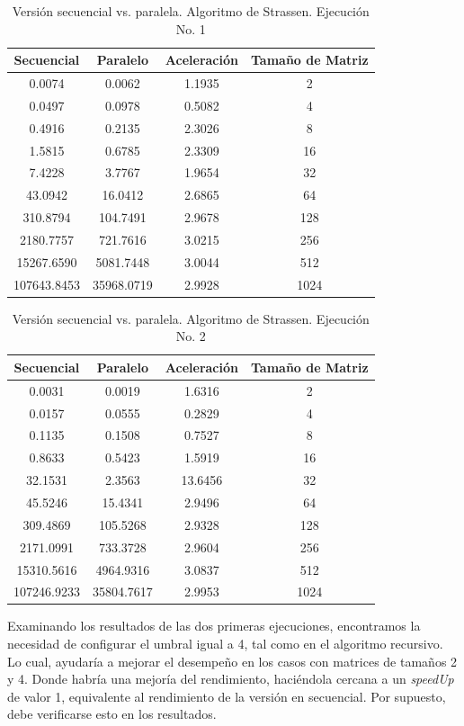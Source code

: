 \documentclass{article}
\begin{document}
\begin{table}[ht]
\centering
\begin{tabular}{|c|c|c|c|}
\hline
\textbf{Secuencial} & \textbf{Paralelo} & \textbf{Aceleración} & \textbf{Tamaño de Matriz} \\
\hline
0.0074 & 0.0062 & 1.1935 & 2 \\
0.0497 & 0.0978 & 0.5082 & 4 \\
0.4916 & 0.2135 & 2.3026 & 8 \\
1.5815 & 0.6785 & 2.3309 & 16 \\
7.4228 & 3.7767 & 1.9654 & 32 \\
43.0942 & 16.0412 & 2.6865 & 64 \\
310.8794 & 104.7491 & 2.9678 & 128 \\
2180.7757 & 721.7616 & 3.0215 & 256 \\
15267.6590 & 5081.7448 & 3.0044 & 512 \\
107643.8453 & 35968.0719 & 2.9928 & 1024 \\
\hline
\end{tabular}
\caption{Versión secuencial vs. paralela. Algoritmo de Strassen. Ejecución No. 1}
\end{table}

\begin{table}[ht]
\centering
\begin{tabular}{|c|c|c|c|}
\hline
\textbf{Secuencial} & \textbf{Paralelo} & \textbf{Aceleración} & \textbf{Tamaño de Matriz} \\
\hline
0.0031 & 0.0019 & 1.6316 & 2 \\
0.0157 & 0.0555 & 0.2829 & 4 \\
0.1135 & 0.1508 & 0.7527 & 8 \\
0.8633 & 0.5423 & 1.5919 & 16 \\
32.1531 & 2.3563 & 13.6456 & 32 \\
45.5246 & 15.4341 & 2.9496 & 64 \\
309.4869 & 105.5268 & 2.9328 & 128 \\
2171.0991 & 733.3728 & 2.9604 & 256 \\
15310.5616 & 4964.9316 & 3.0837 & 512 \\
107246.9233 & 35804.7617 & 2.9953 & 1024 \\
\hline
\end{tabular}
\caption{Versión secuencial vs. paralela. Algoritmo de Strassen. Ejecución No. 2}
\end{table}

Examinando los resultados de las dos primeras ejecuciones, encontramos la necesidad de configurar el umbral igual a 4, tal como en el algoritmo recursivo. Lo cual, ayudaría a mejorar el desempeño en los casos con matrices de tamaños 2 y 4. Donde habría una mejoría del rendimiento, haciéndola cercana a un \textit{speedUp} de valor 1, equivalente al rendimiento de la versión en secuencial. Por supuesto, debe verificarse esto en los resultados.\\
\end{document}
